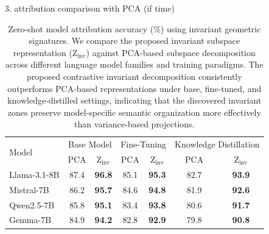 3. attribution comparison with PCA (if time)


\begin{table}[!ht]
\centering
\small
\setlength{\tabcolsep}{8pt}
\renewcommand{\arraystretch}{1.2}
\begin{tabular}{l|cc|cc|cc}
\hline
\multirow{2}{*}{Model}
& \multicolumn{2}{c|}{Base Model}
& \multicolumn{2}{c|}{Fine-Tuning}
& \multicolumn{2}{c}{Knowledge Distillation} \\

& PCA & Z$_{\text{inv}}$
& PCA & Z$_{\text{inv}}$
& PCA & Z$_{\text{inv}}$ \\

\hline

Llama-3.1-8B
& 87.4 & \textbf{96.8}
& 85.1 & \textbf{95.3}
& 82.7 & \textbf{93.9} \\

Mistral-7B
& 86.2 & \textbf{95.7}
& 84.6 & \textbf{94.8}
& 81.9 & \textbf{92.6} \\

Qwen2.5-7B
& 85.8 & \textbf{95.1}
& 83.4 & \textbf{93.8}
& 80.6 & \textbf{91.7} \\

Gemma-7B
& 84.9 & \textbf{94.2}
& 82.8 & \textbf{92.9}
& 79.8 & \textbf{90.8} \\

\hline
\end{tabular}
\vspace{0.4em}
\caption{
Zero-shot model attribution accuracy (\%) using invariant geometric signatures.
We compare the proposed invariant subspace representation
(Z$_{\text{inv}}$) against PCA-based subspace decomposition across
different language model families and training paradigms.
The proposed contrastive invariant decomposition consistently outperforms
PCA-based representations under base, fine-tuned, and knowledge-distilled settings,
indicating that the discovered invariant zones preserve model-specific semantic
organization more effectively than variance-based projections.
}
\label{tab:model_attribution_comparison}
\end{table}


